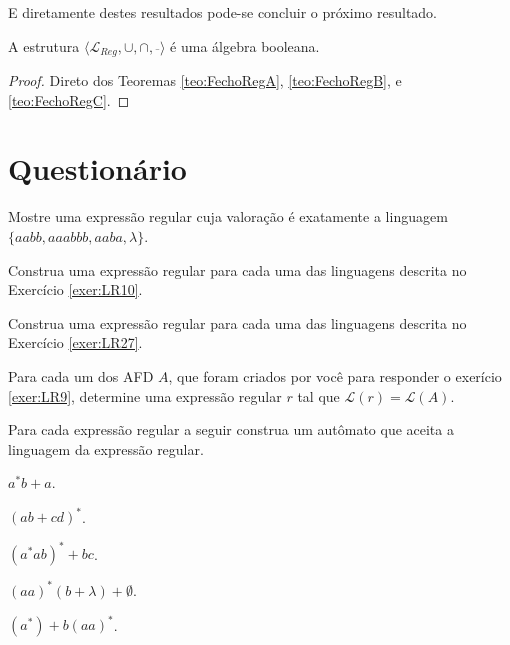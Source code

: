 E diretamente destes resultados pode-se concluir o próximo resultado.

\begin{corolario}
	A estrutura $\langle \mathcal{L}_{Reg}, \cup, \cap, \overline{ \ } \rangle$ é uma álgebra booleana.
\end{corolario}

\begin{proof}
	Direto dos Teoremas \ref{teo:FechoRegA}, \ref{teo:FechoRegB}, e \ref{teo:FechoRegC}.
\end{proof}

\section{Questionário}\label{sec:Questionario3part4}

\begin{questao}\label{exer:EGR35}
	Mostre uma expressão regular cuja valoração é exatamente a linguagem $\{aabb, aaabbb, aaba, \lambda\}$. 
\end{questao}

\begin{questao}\label{exer:EGR36}
	Construa uma expressão regular para cada uma das linguagens descrita no Exercício \ref{exer:LR10}.
\end{questao}

\begin{questao}\label{exer:EGR37}
	Construa uma expressão regular para cada uma das linguagens descrita no Exercício \ref{exer:LR27}.
\end{questao}

\begin{questao}\label{exer:EGR38}
	Para cada um dos AFD $A$, que foram criados por você para responder o exerício \ref{exer:LR9}, determine uma expressão regular $r$ tal que $\mathcal{L}(r) = \mathcal{L}(A)$.
\end{questao}

\begin{questao}\label{exer:EGR39}
	Para cada expressão regular a seguir construa um autômato que aceita a linguagem da expressão regular.
\end{questao}

\begin{exerList}
	\item $a^*b + a$.
	\item $(ab + cd)^*$.
	\item $(a^*ab)^* + bc$.
	\item $(aa)^* (b + \lambda) + \emptyset$.
	\item $(a^*) + b(aa)^*$.
\end{exerList}

